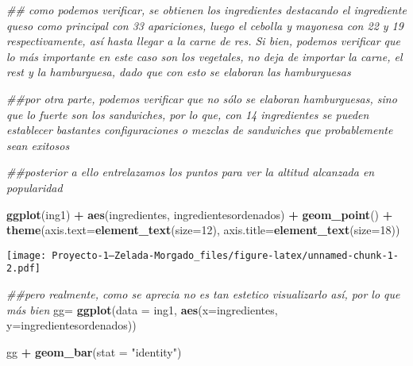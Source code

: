 \documentclass[
]{article}
\newenvironment{Shaded}{\begin{snugshade}}{\end{snugshade}}
\newcommand{\CommentTok}[1]{\textcolor[rgb]{0.56,0.35,0.01}{\textit{#1}}}
\newcommand{\DataTypeTok}[1]{\textcolor[rgb]{0.13,0.29,0.53}{#1}}
\newcommand{\DecValTok}[1]{\textcolor[rgb]{0.00,0.00,0.81}{#1}}
\newcommand{\KeywordTok}[1]{\textcolor[rgb]{0.13,0.29,0.53}{\textbf{#1}}}
\newcommand{\NormalTok}[1]{#1}
\newcommand{\OperatorTok}[1]{\textcolor[rgb]{0.81,0.36,0.00}{\textbf{#1}}}
\newcommand{\StringTok}[1]{\textcolor[rgb]{0.31,0.60,0.02}{#1}}
\begin{document}
\begin{Shaded}
\begin{Highlighting}[]
\CommentTok{## como podemos verificar, se obtienen los ingredientes destacando el ingrediente queso como principal con 33 apariciones, luego el cebolla y mayonesa con 22 y 19 respectivamente, así hasta llegar a la carne de res. Si bien, podemos verificar que lo más importante en este caso son los vegetales, no deja de importar la carne, el rest y la hamburguesa, dado que con esto se elaboran las hamburguesas}

\CommentTok{##por otra parte, podemos verificar que no sólo se elaboran hamburguesas, sino que lo fuerte son los sandwiches, por lo que, con 14 ingredientes se pueden establecer bastantes configuraciones o mezclas de sandwiches que probablemente sean exitosos}



\CommentTok{##posterior a ello entrelazamos los puntos para ver la altitud alcanzada en popularidad}



\KeywordTok{ggplot}\NormalTok{(ing1) }\OperatorTok{+}\StringTok{ }\KeywordTok{aes}\NormalTok{(ingredientes, ingredientesordenados) }\OperatorTok{+}
\StringTok{  }\KeywordTok{geom_point}\NormalTok{() }\OperatorTok{+}\StringTok{ }\KeywordTok{theme}\NormalTok{(}\DataTypeTok{axis.text=}\KeywordTok{element_text}\NormalTok{(}\DataTypeTok{size=}\DecValTok{12}\NormalTok{), }\DataTypeTok{axis.title=}\KeywordTok{element_text}\NormalTok{(}\DataTypeTok{size=}\DecValTok{18}\NormalTok{))}
\end{Highlighting}
\end{Shaded}

\texttt{[image: Proyecto-1--Zelada-Morgado\_files/figure-latex/unnamed-chunk-1-2.pdf]}

\begin{Shaded}
\begin{Highlighting}[]
\CommentTok{##pero realmente, como se aprecia no es tan estetico visualizarlo así, por lo que más bien }
\NormalTok{gg=}\StringTok{ }\KeywordTok{ggplot}\NormalTok{(}\DataTypeTok{data =}\NormalTok{ ing1, }\KeywordTok{aes}\NormalTok{(}\DataTypeTok{x=}\NormalTok{ingredientes, }\DataTypeTok{y=}\NormalTok{ingredientesordenados))}

\NormalTok{gg }\OperatorTok{+}\StringTok{ }\KeywordTok{geom_bar}\NormalTok{(}\DataTypeTok{stat =} \StringTok{"identity"}\NormalTok{)}
\end{Highlighting}
\end{Shaded}
\end{document}
